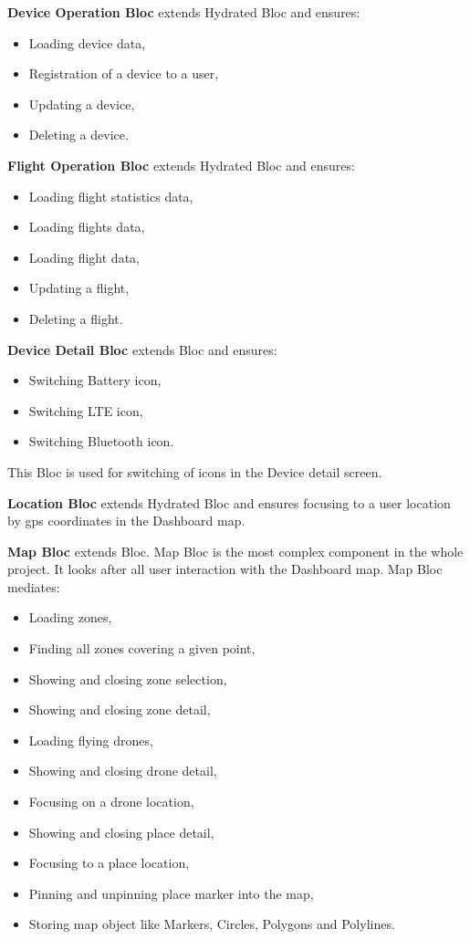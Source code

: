 \textbf{Device Operation Bloc} extends Hydrated Bloc and ensures:
\begin{itemize}
    \item Loading device data,
    \item Registration of a device to a user,
    \item Updating a device,
    \item Deleting a device.
\end{itemize}
\textbf{Flight Operation Bloc} extends Hydrated Bloc and ensures:
\begin{itemize}
    \item Loading flight statistics data,
    \item Loading flights data,
    \item Loading flight data,
    \item Updating a flight,
    \item Deleting a flight.
\end{itemize}
\textbf{Device Detail Bloc} extends Bloc and ensures:
\begin{itemize}
    \item Switching Battery icon,
    \item Switching LTE icon,
    \item Switching Bluetooth icon.
\end{itemize}
This Bloc is used for switching of icons in the Device detail screen.

\textbf{Location Bloc} extends Hydrated Bloc and ensures focusing to a user location by \acrshort{gps} coordinates in the Dashboard map.

\textbf{Map Bloc} extends Bloc.
Map Bloc is the most complex component in the whole project.
It looks after all user interaction with the Dashboard map.
Map Bloc mediates:
\begin{itemize}
    \item Loading zones,
    \item Finding all zones covering a given point,
    \item Showing and closing zone selection,
    \item Showing and closing zone detail,
    \item Loading flying drones,
    \item Showing and closing drone detail,
    \item Focusing on a drone location,
    \item Showing and closing place detail,
    \item Focusing to a place location,
    \item Pinning and unpinning place marker into the map,
    \item Storing map object like Markers, Circles, Polygons and Polylines.
\end{itemize}

